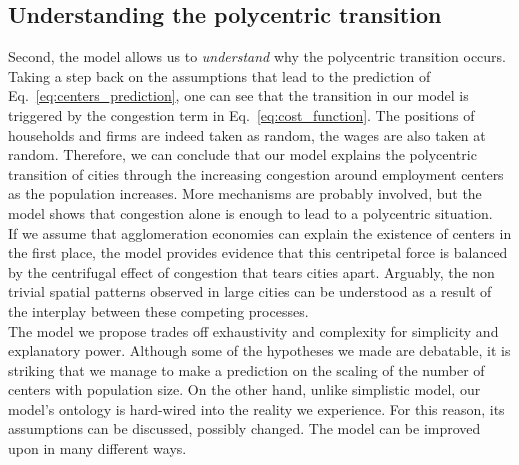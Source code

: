 \subsection{Understanding the polycentric transition}
\label{sub:understanding_the_polycentric_tranistion}

Second, the model allows us to \emph{understand} why the polycentric transition
occurs. Taking a step back on the assumptions that lead to the prediction of
Eq.~\ref{eq:centers_prediction}, one can see that the transition
in our model is triggered by the congestion term in Eq.~\ref{eq:cost_function}. The positions
of households and firms are indeed taken as random, the wages are also taken at
random. Therefore, we can conclude that our model explains the polycentric
transition of cities through the increasing congestion around employment centers
as the population increases. More mechanisms are probably involved, but the model
shows that congestion alone is enough to lead to a polycentric situation.\\

If we assume that agglomeration economies can explain the
existence of centers in the first place, the model provides evidence that this
centripetal force is balanced by the centrifugal effect of congestion that
tears cities apart. Arguably, the non trivial spatial patterns observed in large cities can
 be understood as a result of the interplay between these competing
processes.\\

The model we propose trades off exhaustivity and complexity for simplicity and
explanatory power. Although some of the hypotheses we made are debatable, it is
striking that we manage to make a prediction on the scaling of the number of
centers with population size. On the other hand, unlike simplistic model, our
model's ontology is hard-wired into the reality we experience. For this reason,
its assumptions can be discussed, possibly changed. The model can be improved
upon in many different ways.
